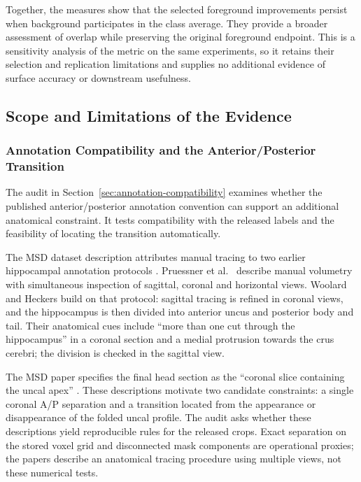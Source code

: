 \documentclass[12pt,a4paper]{article}
\begin{document}
Together, the measures show that the selected foreground improvements
persist when background participates in the class average. They provide
a broader assessment of overlap while preserving the original
foreground endpoint. This is a sensitivity analysis of the metric on
the same experiments, so it retains their selection and replication
limitations and supplies no additional evidence of surface accuracy
or downstream usefulness.
\FloatBarrier


\FloatBarrier
\subsection{Scope and Limitations of the Evidence}
\label{sec:limitations}

\subsubsection{Annotation Compatibility and the Anterior/Posterior Transition}
\label{sec:annotation-results}

The audit in Section~\ref{sec:annotation-compatibility} examines whether
the published anterior/posterior annotation convention can support an
additional anatomical constraint. It tests compatibility with the
released labels and the feasibility of locating the transition
automatically.

The MSD dataset description attributes manual tracing to two earlier
hippocampal annotation protocols \cite{simpson2019dataset}.
Pruessner et al.\ \cite{pruessner2000volumetry} describe manual volumetry
with simultaneous inspection of sagittal, coronal and horizontal views.
Woolard and Heckers \cite{woolard2012asymmetry} build on that protocol:
sagittal tracing is refined in coronal views, and the hippocampus is then
divided into anterior uncus and posterior body and tail. Their anatomical
cues include ``more than one cut through the hippocampus'' in a coronal
section and a medial protrusion towards the crus cerebri; the division
is checked in the sagittal view.

The MSD paper specifies the final head section as the ``coronal slice
containing the uncal apex'' \cite{simpson2019dataset}. These descriptions
motivate two candidate constraints: a single coronal A/P separation and
a transition located from the appearance or disappearance of the folded
uncal profile. The audit asks whether these descriptions yield
reproducible rules for the released crops. Exact separation on the stored
voxel grid and disconnected mask components are operational proxies;
the papers describe an anatomical tracing procedure using multiple
views, not these numerical tests.
\end{document}
